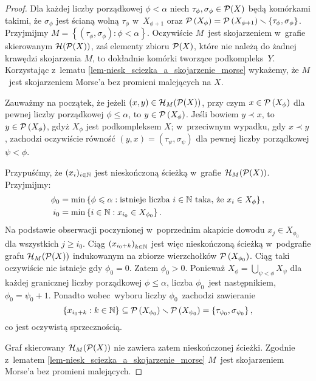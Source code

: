 \begin{proof}
Dla każdej liczby porządkowej $\phi<\alpha$ niech $\tau_\phi,\sigma_\phi\in\mathcal{P}(X)$ będą komórkami takimi, że $\sigma_\phi$ jest ścianą wolną $\tau_\phi$ w~$X_{\phi+1}$ oraz $\mathcal{P}\left(X_{\phi}\right)=\mathcal{P}\left(X_{\phi+1}\right)\smallsetminus\left\{\tau_\phi,\sigma_\phi\right\}$. Przyjmijmy $M=\left\{\left(\tau_\phi,\sigma_\phi\right):\phi<\alpha\right\}$. Oczywiście $M$~jest skojarzeniem w~grafie skierowanym $\mathcal{H}(\mathcal{P}(X))$, zaś elementy zbioru $\mathcal{P}(X)$, które nie należą do żadnej krawędzi skojarzenia $M$, to dokładnie komórki tworzące podkompleks~$Y$. Korzystając z~lematu \ref{lem-niesk_sciezka_a_skojarzenie_morse} wykażemy, że $M$~jest skojarzeniem Morse'a bez promieni malejących na $X$.

Zauważmy na początek, że jeżeli $(x,y)\in\mathcal{H}_M(\mathcal{P}(X))$, przy czym $x\in \mathcal{P}\left(X_\phi\right)$ dla pewnej liczby porządkowej $\phi\leq \alpha$, to $y\in \mathcal{P}\left(X_\phi\right)$. Jeśli bowiem $y\prec x$, to \mbox{$y\in \mathcal{P}\left(X_\phi\right)$}, gdyż $X_\phi$ jest podkompleksem $X$; w~przeciwnym wypadku, gdy \mbox{$x\prec y$}, zachodzi oczywiście równość $(y,x)=\left(\tau_\psi,\sigma_\psi\right)$ dla pewnej liczby porządkowej $\psi< \phi$.

Przypuśćmy, że $(x_i)_{i\in \mathbb{N}}$ jest nieskończoną ścieżką w~grafie $\mathcal{H}_{M}(\mathcal{P}(X))$. Przyjmijmy: \begin{align*}\phi_0&=\min\left\{\phi\leqslant \alpha:\text{istnieje liczba } i\in\mathbb{N} \text{ taka, że } x_i\in X_\phi\right\},\\ i_0&=\min\left\{i\in\mathbb{N}: x_{i_0}\in X_{\phi_0}\right\}.\end{align*}
Na podstawie obserwacji poczynionej w~poprzednim akapicie dowodu $x_j\in X_{\phi_0}$ dla wszystkich $j\geq i_0$. Ciąg $\left(x_{i_0+k}\right)_{k\in\mathbb{N}}$ jest więc nieskończoną ścieżką w~podgrafie grafu $\mathcal{H}_{M}(\mathcal{P}(X))$ indukowanym na zbiorze wierzchołków $\mathcal{P}\left(X_{\phi_0}\right)$. Ciąg taki oczywiście nie istnieje gdy $\phi_0=0$. Zatem $\phi_0>0$. Ponieważ $X_\phi=\bigcup_{\psi<\phi} X_\psi$ dla każdej granicznej liczby porządkowej $\phi\leq \alpha$, liczba $\phi_0$~jest następnikiem, $\phi_0=\psi_0+1$. Ponadto wobec~wyboru liczby $\phi_0$~zachodzi zawieranie \[\left\{x_{i_0+k}:k\in\mathbb{N}\right\}\subseteq \mathcal{P}\left(X_{\phi_0}\right)\smallsetminus \mathcal{P}\left(X_{\psi_0}\right)=\left\{\tau_{\psi_0},\sigma_{\psi_0}\right\},\] co jest oczywistą sprzecznością. 

Graf skierowany $\mathcal{H}_M(\mathcal{P}(X))$ nie zawiera zatem nieskończonej ścieżki. Zgodnie z~lematem \ref{lem-niesk_sciezka_a_skojarzenie_morse} $M$~jest skojarzeniem Morse'a bez promieni malejących.
\end{proof}

